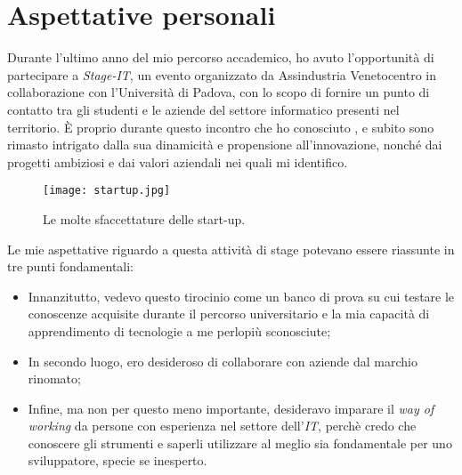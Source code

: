 \section{Aspettative personali}
Durante l'ultimo anno del mio percorso accademico, ho avuto l'opportunità di partecipare a \textit{Stage-IT}, un evento organizzato da Assindustria Venetocentro in collaborazione con l'Università di Padova, con lo scopo di fornire un punto di contatto tra gli studenti e le aziende del settore informatico presenti nel territorio.
\`E proprio durante questo incontro che ho conosciuto \AD , e subito sono rimasto intrigato dalla sua dinamicità e propensione all'innovazione, nonché dai progetti ambiziosi e dai valori aziendali nei quali mi identifico.\\
\begin{figure}[h]
\texttt{[image: startup.jpg]}
\centering
\caption{Le molte sfaccettature delle start-up.} 
\label{fig:startup}
\end{figure}
Le mie aspettative riguardo a questa attività di stage potevano essere riassunte in tre punti fondamentali:
\begin{itemize}
\item Innanzitutto, vedevo questo tirocinio come un banco di prova su cui testare le conoscenze acquisite durante il percorso universitario e la mia capacità di apprendimento di tecnologie a me perlopiù sconosciute;
\item In secondo luogo, ero desideroso di collaborare con aziende dal marchio rinomato;
\item Infine, ma non per questo meno importante, desideravo imparare il \textit{way of working} da persone con esperienza nel settore dell'\textit{IT}, perchè credo che conoscere gli strumenti e saperli utilizzare al meglio sia fondamentale per uno sviluppatore, specie se inesperto.
\end{itemize}
